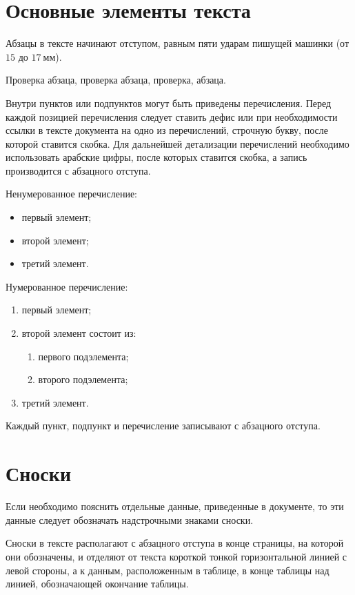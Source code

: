 \documentclass[russian,koi8-r,pointsection]{eskdtext}
\begin{document}
\section{Основные элементы текста}
\point Абзацы в тексте начинают отступом, равным пяти ударам пишущей
машинки (от $15$ до $17~\text{мм}$).

Проверка абзаца, проверка абзаца, проверка, абзаца.

\point Внутри пунктов или подпунктов могут быть приведены
перечисления.  Перед каждой позицией перечисления следует ставить
дефис или при необходимости ссылки в тексте документа на одно из
перечислений, строчную букву, после которой ставится скобка. Для
дальнейшей детализации перечислений необходимо использовать
арабские цифры, после которых ставится скобка, а запись
производится с абзацного отступа.

\point Ненумерованное перечисление:
\begin{itemize}
\item первый элемент;
\item второй элемент;
\item третий элемент.
\end{itemize}
\point Нумерованное перечисление:
\begin{enumerate}
\item первый элемент;
\item второй элемент состоит из:
\begin{enumerate}
\item первого подэлемента;
\item второго подэлемента;
\end{enumerate}
\item третий элемент.
\end{enumerate}

\point Каждый пункт, подпункт и перечисление записывают с абзацного
отступа.

\section{Сноски}
\point Если необходимо пояснить отдельные данные, приведенные в
документе, то эти данные следует обозначать надстрочными знаками
сноски.

Сноски в тексте располагают с абзацного отступа в конце страницы, на
которой они обозначены, и отделяют от текста короткой тонкой
горизонтальной линией с левой стороны, а к данным, расположенным в
таблице, в конце таблицы над линией, обозначающей окончание таблицы.
\end{document}
